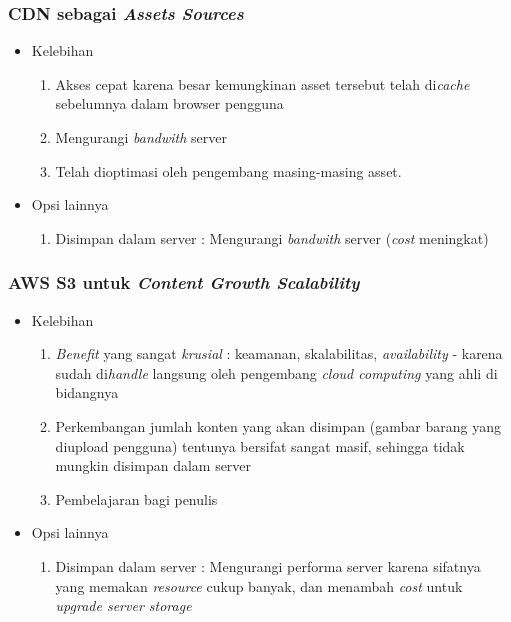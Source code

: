 		
	\subsubsection{\textsc{CDN} sebagai \textit{Assets Sources}}
		\begin{itemize}
			\item Kelebihan
			\begin{enumerate}
				\item Akses cepat karena besar kemungkinan asset tersebut telah di\textit{cache} sebelumnya dalam browser pengguna
				\item Mengurangi \textit{bandwith} server
				\item Telah dioptimasi oleh pengembang masing-masing asset.
			\end{enumerate}
			\item Opsi lainnya
			\begin{enumerate}
				\item Disimpan dalam server : Mengurangi \textit{bandwith} server (\textit{cost} meningkat)
			\end{enumerate}
		\end{itemize}
		
	\subsubsection{\textsc{AWS S3} untuk \textit{Content Growth Scalability}}
	\begin{itemize}
		\item Kelebihan
		\begin{enumerate}
			\item \textit{Benefit} yang sangat \textit{krusial} : keamanan, skalabilitas, \textit{availability} - karena sudah di\textit{handle} langsung oleh pengembang \textit{cloud computing} yang ahli di bidangnya
			\item Perkembangan jumlah konten yang akan disimpan (gambar barang yang diupload pengguna)  tentunya bersifat sangat masif, sehingga tidak mungkin disimpan dalam server
			\item Pembelajaran bagi penulis
		\end{enumerate}
		\item Opsi lainnya
		\begin{enumerate}
			\item Disimpan dalam server : Mengurangi performa server karena sifatnya yang memakan \textit{resource} cukup banyak, dan menambah \textit{cost} untuk \textit{upgrade server storage}
		\end{enumerate}
	\end{itemize}
	
